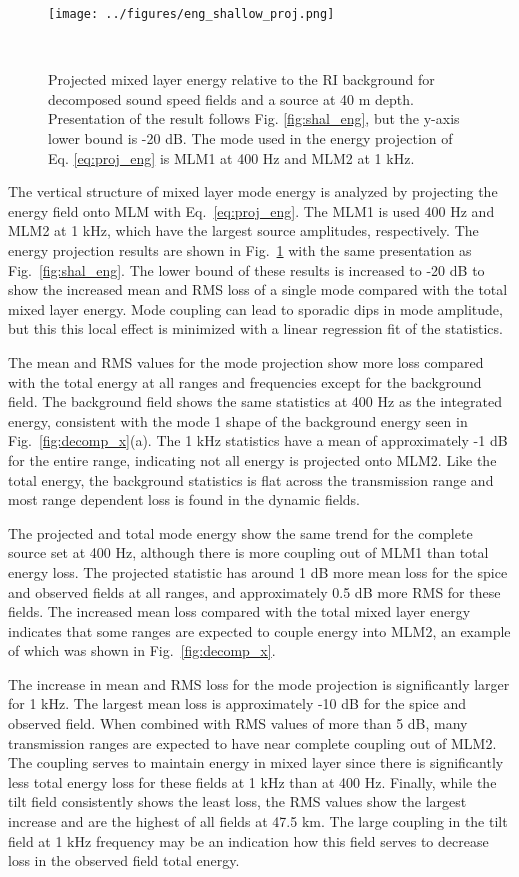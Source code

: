 \documentclass[preprint,NumberedRefs]{JASA}
\begin{document}
\begin{figure}
\texttt{[image: ../figures/eng\_shallow\_proj.png]}
    \caption{Projected mixed layer energy relative to the RI background for decomposed sound speed fields and a source at 40 m depth. Presentation of the result follows Fig. \ref{fig:shal_eng}, but the y-axis lower bound is -20 dB. The mode used in the energy projection of Eq. \eqref{eq:proj_eng} is MLM1 at 400 Hz and MLM2 at 1 kHz.}
    \label{fig:shal_proj}
\end{figure}
The vertical structure of mixed layer mode energy is analyzed by projecting the energy field onto MLM with Eq.~\eqref{eq:proj_eng}. The MLM1 is used 400 Hz and MLM2 at 1 kHz, which have the largest source amplitudes, respectively. The energy projection results are shown in Fig.~\ref{fig:shal_proj} with the same presentation as Fig.~\ref{fig:shal_eng}. The lower bound of these results is increased to -20 dB to show the increased mean and RMS loss of a single mode compared with the total mixed layer energy. Mode coupling can lead to sporadic dips in mode amplitude, but this this local effect is minimized with a linear regression fit of the statistics.

The mean and RMS values for the mode projection show more loss compared with the total energy at all ranges and frequencies except for the background field. The background field shows the same statistics at 400 Hz as the integrated energy, consistent with the mode 1 shape of the background energy seen in Fig.~\ref{fig:decomp_x}(a). The 1 kHz statistics have a mean of approximately -1 dB for the entire range, indicating not all energy is projected onto MLM2. Like the total energy, the background statistics is flat across the transmission range and most range dependent loss is found in the dynamic fields.

The projected and total mode energy show the same trend for the complete source set at 400 Hz, although there is more coupling out of MLM1 than total energy loss. The projected statistic has around 1 dB more mean loss for the spice and observed fields at all ranges, and approximately 0.5 dB more RMS for these fields. The increased mean loss compared with the total mixed layer energy indicates that some ranges are expected to couple energy into MLM2, an example of which was shown in Fig.~\ref{fig:decomp_x}.

The increase in mean and RMS loss for the mode projection is significantly larger for 1 kHz. The largest mean loss is approximately -10 dB for the spice and observed field. When combined with RMS values of more than 5 dB, many transmission ranges are expected to have near complete coupling out of MLM2. The coupling serves to maintain energy in mixed layer since there is significantly less total energy loss for these fields at 1 kHz than at 400 Hz. Finally, while the tilt field consistently shows the least loss, the RMS values show the largest increase and are the highest of all fields at 47.5 km. The large coupling in the tilt field at 1 kHz frequency may be an indication how this field serves to decrease loss in the observed field total energy.
\end{document}
